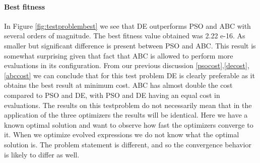 \paragraph{Best fitness}
In Figure \ref{fig:testproblembest} we see that DE outperforms PSO and ABC with several orders of magnitude. The best fitness value obtained was 2.22 e-16. As smaller but significant difference is present between PSO and ABC. This result is somewhat surprising given that fact that ABC is allowed to perform more evaluations in its configuration. From our previous discussion \ref{psocost},\ref{decost},\ref{abccost} we can conclude that for this test problem DE is clearly preferable as it obtains the best result at minimum cost. ABC has almost double the cost compared to PSO and DE, with PSO and DE having an equal cost in evaluations. The results on this testproblem do not necessarily mean that in the application of the three optimizers the results will be identical. Here we have a known optimal solution and want to observe how fast the optimizers converge to it. When we optimize evolved expressions we do not know what the optimal solution is. The problem statement is different, and so the convergence behavior is likely to differ as well. 
